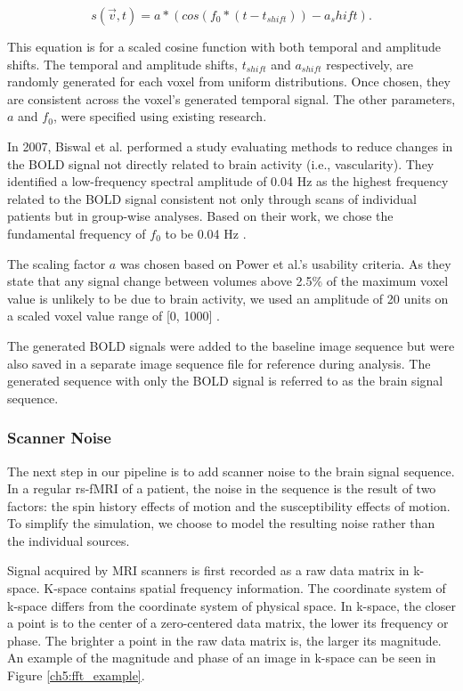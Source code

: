 \begin{equation}
s(\vec{v}, t) = a*(cos(f_0 * (t-t_{shift})) - a_shift).
\label{ch5:bold_eq}
\end{equation}

\noindent This equation is for a scaled cosine function with both temporal and amplitude shifts. The temporal and amplitude shifts, $t_{shift}$ and $a_{shift}$ respectively, are randomly generated for each voxel from uniform distributions. Once chosen, they are consistent across the voxel's generated temporal signal. The other parameters, $a$ and $f_0$, were specified using existing research. 

In 2007, Biswal et al. performed a study evaluating methods to reduce changes in the BOLD signal not directly related to brain activity (i.e., vascularity). They identified a low-frequency spectral amplitude of 0.04 Hz as the highest frequency related to the BOLD signal consistent not only through scans of individual patients but in group-wise analyses. Based on their work, we chose the fundamental frequency of $f_0$ to be 0.04 Hz \cite{Biswal2007}. 

The scaling factor $a$ was chosen based on Power et al.'s usability criteria. As they state that any signal change between volumes above 2.5\% of the maximum voxel value is unlikely to be due to brain activity, we used an amplitude of 20 units on a scaled voxel value range of [0, 1000] \cite{Power2012}. 

The generated BOLD signals were added to the baseline image sequence but were also saved in a separate image sequence file for reference during analysis. The generated sequence with only the BOLD signal is referred to as the brain signal sequence.

\subsubsection{Scanner Noise}

The next step in our pipeline is to add scanner noise to the brain signal sequence. In a regular rs-fMRI of a patient, the noise in the sequence is the result of two factors: the spin history effects of motion and the susceptibility effects of motion. To simplify the simulation, we choose to model the resulting noise rather than the individual sources.

Signal acquired by MRI scanners is first recorded as a raw data matrix in k-space. K-space contains spatial frequency information. The coordinate system of k-space differs from the coordinate system of physical space. In k-space, the closer a point is to the center of a zero-centered data matrix, the lower its frequency or phase. The brighter a point in the raw data matrix is, the larger its magnitude. An example of the magnitude and phase of an image in k-space can be seen in Figure \ref{ch5:fft_example}.

